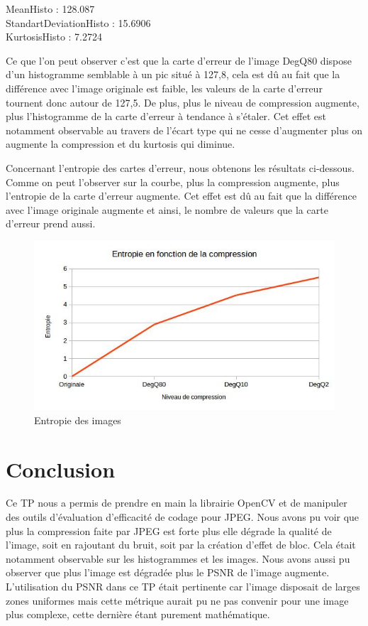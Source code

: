 \documentclass[12pt]{report}
\begin{document}
\begin{center}
MeanHisto : 128.087\\
StandartDeviationHisto : 15.6906\\
KurtosisHisto : 7.2724
\end{center}

Ce que l'on peut observer c'est que la carte d'erreur de l'image DegQ80 dispose d'un histogramme semblable à un pic situé à 127,8, cela est dû au fait que la différence avec l'image originale est faible, les valeurs de la carte d'erreur tournent donc autour de 127,5. De plus, plus le niveau de compression augmente, plus l'histogramme de la carte d'erreur à tendance à s'étaler. Cet effet est notamment observable au travers de l'écart type qui ne cesse d'augmenter plus on augmente la compression et du kurtosis qui diminue.

\newpage
Concernant l'entropie des cartes d'erreur, nous obtenons les résultats ci-dessous. Comme on peut l'observer sur la courbe, plus la compression augmente, plus l'entropie de la carte d'erreur augmente. Cet effet est dû au fait que la différence avec l'image originale augmente et ainsi, le nombre de valeurs que la carte d'erreur prend aussi.

\begin{figure}[H]
\begin{center}
\includegraphics[scale=0.8]{../ImageRes/entropie_erreur.jpg} 
\caption{Entropie des images}
\end{center}
\end{figure}

\section{Conclusion}

Ce TP nous a permis de prendre en main la librairie OpenCV et de manipuler des outils d'évaluation d’efficacité de codage pour JPEG. Nous avons pu voir que plus la compression faite par JPEG est forte plus elle dégrade la qualité de l'image, soit en rajoutant du bruit, soit par la création d'effet de bloc. Cela était notamment observable sur les histogrammes et les images. Nous avons aussi pu observer que plus l'image est dégradée plus le PSNR de l'image augmente. L'utilisation du PSNR dans ce TP était pertinente car l'image disposait de larges zones uniformes mais cette métrique aurait pu ne pas convenir pour une image plus complexe, cette dernière étant purement mathématique.
\end{document}
